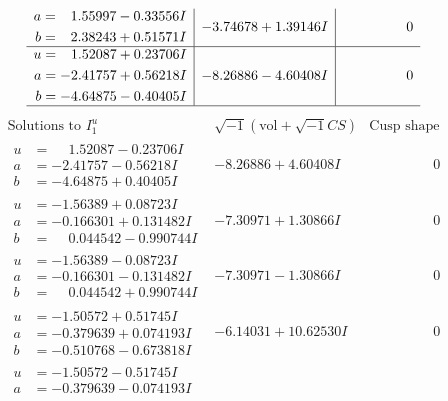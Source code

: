 \documentclass[1p]{elsarticle_modified}
\theoremstyle{definition}
\newcommand{\I}{\sqrt{-1}}
\begin{document}
$$\begin{array}{c|c|c}
\begin{aligned}
a &= \phantom{-}1.55997 - 0.33556 I \\
b &= \phantom{-}2.38243 + 0.51571 I\end{aligned}
 & -3.74678 + 1.39146 I & \phantom{-0.000000 } 0 \\ \hline\begin{aligned}
u &= \phantom{-}1.52087 + 0.23706 I \\
a &= -2.41757 + 0.56218 I \\
b &= -4.64875 - 0.40405 I\end{aligned}
 & -8.26886 - 4.60408 I & \phantom{-0.000000 } 0\\
 \hline 
 \end{array}$$\newpage$$\begin{array}{c|c|c}  
\text{Solutions to }I^u_{1}& \I (\text{vol} + \sqrt{-1}CS) & \text{Cusp shape}\\
 \hline 
\begin{aligned}
u &= \phantom{-}1.52087 - 0.23706 I \\
a &= -2.41757 - 0.56218 I \\
b &= -4.64875 + 0.40405 I\end{aligned}
 & -8.26886 + 4.60408 I & \phantom{-0.000000 } 0 \\ \hline\begin{aligned}
u &= -1.56389 + 0.08723 I \\
a &= -0.166301 + 0.131482 I \\
b &= \phantom{-}0.044542 - 0.990744 I\end{aligned}
 & -7.30971 + 1.30866 I & \phantom{-0.000000 } 0 \\ \hline\begin{aligned}
u &= -1.56389 - 0.08723 I \\
a &= -0.166301 - 0.131482 I \\
b &= \phantom{-}0.044542 + 0.990744 I\end{aligned}
 & -7.30971 - 1.30866 I & \phantom{-0.000000 } 0 \\ \hline\begin{aligned}
u &= -1.50572 + 0.51745 I \\
a &= -0.379639 + 0.074193 I \\
b &= -0.510768 - 0.673818 I\end{aligned}
 & -6.14031 + 10.62530 I & \phantom{-0.000000 } 0 \\ \hline\begin{aligned}
u &= -1.50572 - 0.51745 I \\
a &= -0.379639 - 0.074193 I \\

\end{aligned}
\end{array}$$
\end{document}
